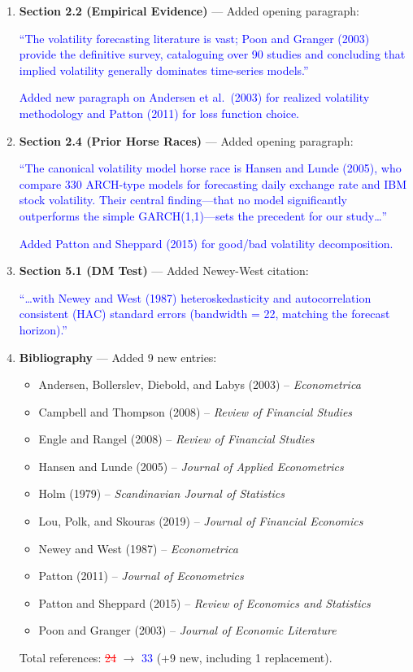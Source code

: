 \documentclass[12pt,a4paper]{article}
\newcommand{\added}[1]{\textcolor{blue}{#1}}
\newcommand{\removed}[1]{\textcolor{red}{\sout{#1}}}
\begin{document}
\begin{enumerate}

\item \textbf{Section 2.2 (Empirical Evidence)} --- Added opening paragraph:

\added{``The volatility forecasting literature is vast; Poon and Granger (2003) provide the definitive survey, cataloguing over 90 studies and concluding that implied volatility generally dominates time-series models.''}

\added{Added new paragraph on Andersen et al.\ (2003) for realized volatility methodology and Patton (2011) for loss function choice.}

\item \textbf{Section 2.4 (Prior Horse Races)} --- Added opening paragraph:

\added{``The canonical volatility model horse race is Hansen and Lunde (2005), who compare 330 ARCH-type models for forecasting daily exchange rate and IBM stock volatility. Their central finding---that no model significantly outperforms the simple GARCH(1,1)---sets the precedent for our study\ldots''}

\added{Added Patton and Sheppard (2015) for good/bad volatility decomposition.}

\item \textbf{Section 5.1 (DM Test)} --- Added Newey-West citation:

\added{``\ldots with Newey and West (1987) heteroskedasticity and autocorrelation consistent (HAC) standard errors (bandwidth = 22, matching the forecast horizon).''}

\item \textbf{Bibliography} --- Added 9 new entries:

\begin{itemize}
    \item Andersen, Bollerslev, Diebold, and Labys (2003) -- \textit{Econometrica}
    \item Campbell and Thompson (2008) -- \textit{Review of Financial Studies}
    \item Engle and Rangel (2008) -- \textit{Review of Financial Studies}
    \item Hansen and Lunde (2005) -- \textit{Journal of Applied Econometrics}
    \item Holm (1979) -- \textit{Scandinavian Journal of Statistics}
    \item Lou, Polk, and Skouras (2019) -- \textit{Journal of Financial Economics}
    \item Newey and West (1987) -- \textit{Econometrica}
    \item Patton (2011) -- \textit{Journal of Econometrics}
    \item Patton and Sheppard (2015) -- \textit{Review of Economics and Statistics}
    \item Poon and Granger (2003) -- \textit{Journal of Economic Literature}
\end{itemize}

Total references: \removed{24} $\rightarrow$ \added{33} (+9 new, including 1 replacement).

\end{enumerate}
\end{document}
